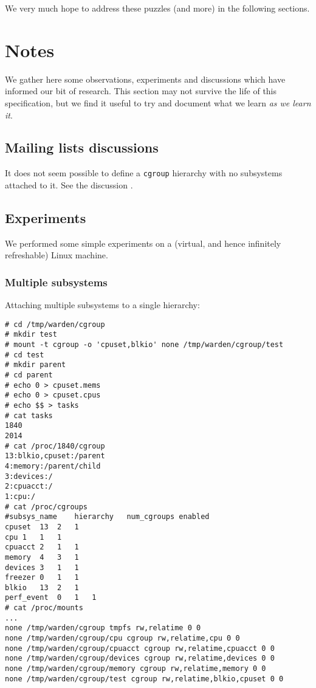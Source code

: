 \documentclass[a4paper,twoside,12pt]{article}
\begin{document}
We very much hope to address these puzzles (and more) in the following sections.

\section{Notes}

We gather here some observations, experiments and discussions which have informed our bit of research. This section may not survive the life of this specification, but we find it useful to try and document what we learn \emph{as we learn it}.

\subsection{Mailing lists discussions}

It does not seem possible to define a \texttt{cgroup} hierarchy with no subsystems attached to it.
See the discussion \cite{noop}.

\subsection{Experiments}
\label{sec:experiments}
We performed some simple experiments on a (virtual, and hence infinitely refreshable) Linux machine.

\subsubsection{Multiple subsystems}

Attaching multiple subsystems to a single hierarchy:
{\small \begin{verbatim}
# cd /tmp/warden/cgroup
# mkdir test
# mount -t cgroup -o 'cpuset,blkio' none /tmp/warden/cgroup/test
# cd test
# mkdir parent
# cd parent
# echo 0 > cpuset.mems 
# echo 0 > cpuset.cpus
# echo $$ > tasks
# cat tasks
1840
2014
# cat /proc/1840/cgroup
13:blkio,cpuset:/parent
4:memory:/parent/child
3:devices:/
2:cpuacct:/
1:cpu:/
# cat /proc/cgroups
#subsys_name	hierarchy	num_cgroups	enabled
cpuset	13	2	1
cpu	1	1	1
cpuacct	2	1	1
memory	4	3	1
devices	3	1	1
freezer	0	1	1
blkio	13	2	1
perf_event	0	1	1
# cat /proc/mounts 
...
none /tmp/warden/cgroup tmpfs rw,relatime 0 0
none /tmp/warden/cgroup/cpu cgroup rw,relatime,cpu 0 0
none /tmp/warden/cgroup/cpuacct cgroup rw,relatime,cpuacct 0 0
none /tmp/warden/cgroup/devices cgroup rw,relatime,devices 0 0
none /tmp/warden/cgroup/memory cgroup rw,relatime,memory 0 0
none /tmp/warden/cgroup/test cgroup rw,relatime,blkio,cpuset 0 0
\end{verbatim}}
\end{document}

